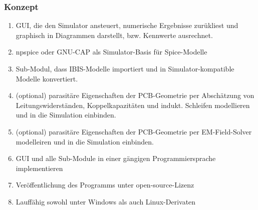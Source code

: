 \documentclass{article}
\begin{document}
\subsubsection*{Konzept}
\begin{enumerate}
\item GUI, die den Simulator ansteuert, numerische Ergebnisse zurükliest und graphisch in Diagrammen darstellt, bzw. Kennwerte ausrechnet. 
\item npspice oder GNU-CAP als Simulator-Basis für Spice-Modelle
\item Sub-Modul, dass IBIS-Modelle importiert und in Simulator-kompatible Modelle konvertiert.
\item (optional) parasitäre Eigenschaften der PCB-Geometrie per Abschätzung von Leitungswiderständen, Koppelkapazitäten und indukt. Schleifen modellieren und in die Simulation einbinden.
\item (optional) parasitäre Eigenschaften der PCB-Geometrie per EM-Field-Solver modelleiren und in die Simulation einbinden.
\item GUI und alle Sub-Module in einer gängigen Programmiersprache implementieren
\item Veröffentlichung des Programms unter open-source-Lizenz
\item Lauffähig sowohl unter Windows als auch Linux-Derivaten
\end{enumerate}


\end{document}
